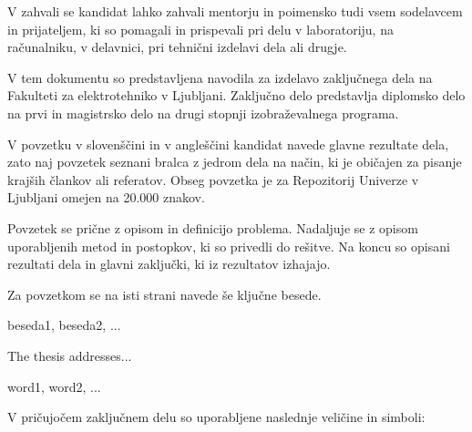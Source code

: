 \documentclass[a4paper,twoside,openright,12pt,slovene]{book}
\date{Ljubljana, \the\year}
\begin{document}
\frontmatter


\maketitle

\zahvala
V zahvali se kandidat lahko zahvali mentorju in poimensko tudi vsem sodelavcem in prijateljem, ki so pomagali in prispevali pri delu v laboratoriju, na računalniku, v delavnici, pri tehnični izdelavi dela ali drugje.

\povzetek
V tem dokumentu so predstavljena navodila za izdelavo zaključnega dela na Fakulteti za elektrotehniko v Ljubljani. Zaključno delo predstavlja diplomsko delo na prvi in magistrsko delo na drugi stopnji izobraževalnega programa.

V povzetku v slovenščini in v angleščini kandidat navede glavne rezultate dela, zato naj povzetek seznani bralca z jedrom dela na način, ki je običajen za pisanje krajših člankov ali referatov. Obseg povzetka je za Repozitorij Univerze v Ljubljani omejen na 20.000 znakov.

Povzetek se prične z opisom in definicijo problema. Nadaljuje se z opisom uporabljenih metod in postopkov, ki so privedli do rešitve. Na koncu so opisani rezultati dela in glavni zaključki, ki iz rezultatov izhajajo.

Za povzetkom se na isti strani navede še ključne besede.

\kljucnebesede
beseda1, beseda2, ...



\abstract
The thesis addresses...

\keywords
word1, word2, ...


\tableofcontents

\seznamslik
\seznamtabel

\seznamsimbolov
V pričujočem zaključnem delu so uporabljene naslednje veličine in simboli:
\end{document}
